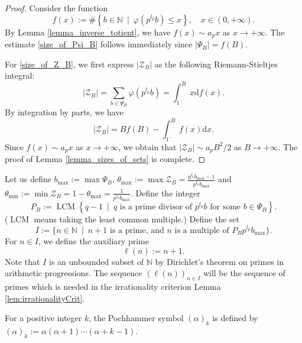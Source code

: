 \documentclass[12pt]{article}
\numberwithin{equation}{section}
\begin{document}
\begin{proof}
	Consider the function 
	\[ f(x) := \#\left\{ b \in \mathbb{N} ~\mid~ \varphi(p^{l_p}b) \leqslant x \right\}, \quad x \in (0,+\infty). \]
By Lemma \ref{lemma_inverse_totient}, we have $f(x) \sim a_p x$ as $x \to +\infty$. The estimate \eqref{size_of_Psi_B} follows immediately since $|\Psi_B|=f(B)$.

For \eqref{size_of_Z_B}, we first express $|\mathcal{Z}_B|$ as the following Riemann-Stieltjes integral:
\[ |\mathcal{Z}_B| = \sum_{b \in \Psi_B} \varphi\left(p^{l_p}b\right) =\int_{1^{-}}^{B} x\mathrm{d}f(x). \]
By integration by parts, we have
\[ |\mathcal{Z}_B| = Bf(B) - \int_{1^{-}}^{B} f(x) \mathrm{d}x.  \]
Since $f(x) \sim a_p x$ as $x \to +\infty$, we obtain that $|\mathcal{Z}_B| \sim a_pB^2/2$ as $B \to +\infty$. The proof of Lemma \ref{lemma_sizes_of_sets} is complete.
\end{proof}

\bigskip

Let us define $b_{\max}:=\max \Psi_B$, $\theta_{\max}:=\max \mathcal{Z}_B=\frac{p^{l_p}b_{\max}-1}{p^{l_p}b_{\max}}$ and $\theta_{\min}:=\min \mathcal{Z}_B=1-\theta_{\max} = \frac{1}{p^{l_p}b_{\max}}$. Define the integer
\[ P_{B} := \operatorname{LCM}\left\{q-1 ~\mid~ q \text{~is a prime divisor of~} p^{l_p}b \text{~for some~} b \in \Psi_B \right\}. \]
($\operatorname{LCM}$ means taking the least common multiple.) Define the set 
\[I:=\{n \in \mathbb{N} ~\mid~ n+1 \text{~is a prime, and~} n \text{~is a multiple of~} P_{B}p^{l_p}b_{\max}\}. \]
For $n\in I$, we define the auxiliary prime
\[\ell(n):=n+1.\] 
Note that $I$ is an unbounded subset of $\mathbb{N}$ by Dirichlet's theorem on primes in arithmetic progressions. The sequence $(\ell(n))_{n\in I}$ will be the sequence of primes which is needed in the irrationality criterion Lemma \ref{lem:irrationalityCrit}.

For a positive integer $k$, the Pochhammer symbol $(\alpha)_k$ is defined by $(\alpha)_k := \alpha(\alpha+1)\cdots(\alpha+k-1)$.
\end{document}
